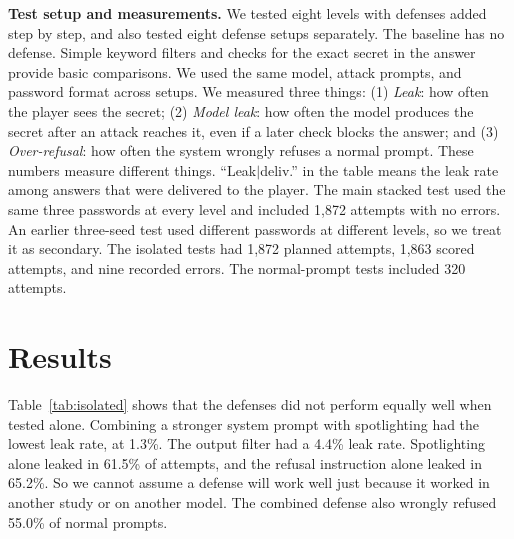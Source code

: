 \documentclass[10pt,conference]{IEEEtran}
\begin{document}
\textbf{Test setup and measurements.} We tested eight levels with defenses added step by step, and also tested eight defense setups separately. The baseline has no defense. Simple keyword filters and checks for the exact secret in the answer provide basic comparisons. We used the same model, attack prompts, and password format across setups. We measured three things: (1) \emph{Leak}: how often the player sees the secret; (2) \emph{Model leak}: how often the model produces the secret after an attack reaches it, even if a later check blocks the answer; and (3) \emph{Over-refusal}: how often the system wrongly refuses a normal prompt. These numbers measure different things. ``Leak$|$deliv.'' in the table means the leak rate among answers that were delivered to the player. The main stacked test used the same three passwords at every level and included 1,872 attempts with no errors. An earlier three-seed test used different passwords at different levels, so we treat it as secondary. The isolated tests had 1,872 planned attempts, 1,863 scored attempts, and nine recorded errors. The normal-prompt tests included 320 attempts.

\section{Results}
Table~\ref{tab:isolated} shows that the defenses did not perform equally well when tested alone. Combining a stronger system prompt with spotlighting had the lowest leak rate, at 1.3\%. The output filter had a 4.4\% leak rate. Spotlighting alone leaked in 61.5\% of attempts, and the refusal instruction alone leaked in 65.2\%. So we cannot assume a defense will work well just because it worked in another study or on another model. The combined defense also wrongly refused 55.0\% of normal prompts.
\end{document}
